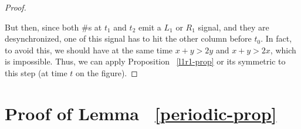 \documentclass{jac}
\theoremstyle{definition}
\begin{document}
\begin{proof}
\begin{center}
    \end{center}
      But then, since both $\#$s at $t_1$ and $t_2$ emit a $L_1$ or $R_1$ signal,
      and they are desynchronized, one of this signal has to hit the other column
      before $t_0$. In fact, to avoid this, we should have at the same time
      $x+y>2y$ and $x+y>2x$, which is impossible. Thus, we can apply Proposition
     ~\ref{l1r1-prop} or its symmetric to this step (at time $t$ on the figure).
  \end{proof}

\section{Proof of Lemma  ~\ref{periodic-prop}}
\end{document}

